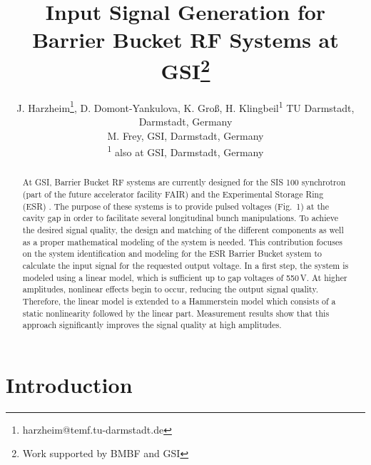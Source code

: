 \documentclass[a4paper,
              ]{jacow}
\begin{document}
\title{Input Signal Generation for Barrier Bucket RF Systems at GSI\thanks{Work supported by BMBF and GSI}}

\author{J. Harzheim\thanks{harzheim@temf.tu-darmstadt.de}, D. Domont-Yankulova, K. Groß, H. Klingbeil\textsuperscript{1} TU Darmstadt, Darmstadt, Germany
	\\
	M.  Frey, GSI, Darmstadt, Germany
	\\
	\textsuperscript{1} also at GSI, Darmstadt, Germany}
	
\maketitle

%
\begin{abstract}
	 At GSI, Barrier Bucket RF systems are currently designed for the SIS 100 synchrotron (part of the future accelerator 
	 facility FAIR) \cite{FAIR} and the Experimental Storage Ring (ESR) \cite{Demo_BB_ESR}. The purpose of these systems is 
	 to provide pulsed voltages (Fig.~1) at the cavity gap in order to facilitate several longitudinal bunch manipulations.	 
	 To achieve the desired signal quality, the design and matching of the different components as well as a proper mathematical modeling
	 of the system is needed. This contribution focuses on the system identification and modeling for the ESR Barrier Bucket system to
	 calculate the input signal for the requested output voltage.
	 In a first step, the system is modeled using a linear model, which is sufficient up to gap voltages of 550\,V. 
	 At higher amplitudes, nonlinear effects begin to occur, reducing the output signal quality. Therefore, the linear model is extended to a Hammerstein 
	 model which consists of a static nonlinearity followed by the linear part. Measurement results show that this approach significantly improves the 
	 signal quality at high amplitudes.
	 
\end{abstract}

\section{Introduction} \vspace*{0.5em} 
	 
\end{document}

